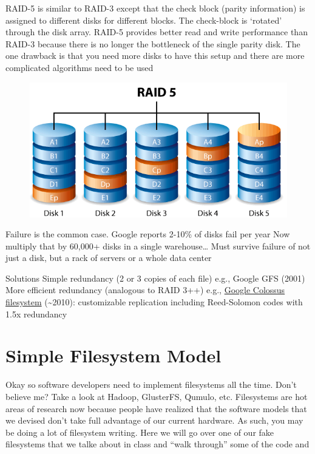 RAID-5 is similar to RAID-3 except that the check block (parity information) is assigned to different disks for different blocks. The check-block is `rotated' through the disk array. RAID-5 provides better read and write performance than RAID-3 because there is no longer the bottleneck of the single parity disk. The one drawback is that you need more disks to have this setup and there are more complicated algorithms need to be used

\begin{figure}[htbp]
\centering
\includegraphics[width=.8\textwidth]{filesystems/images/raid_5.png}
\caption{}
\end{figure}

Failure is the common case. Google reports 2-10\% of disks fail per year Now multiply that by 60,000+ disks in a single warehouse\ldots{} Must survive failure of not just a disk, but a rack of servers or a whole data center

Solutions Simple redundancy (2 or 3 copies of each file) e.g., Google GFS (2001) More efficient redundancy (analogous to RAID 3++) e.g., \href{http://goo.gl/LwFIy}{Google Colossus filesystem} (\textasciitilde{}2010): customizable replication including Reed-Solomon codes with 1.5x redundancy

\section{Simple Filesystem Model}

Okay so software developers need to implement filesystems all the time.
Don't believe me? Take a look at Hadoop, GlusterFS, Qumulo, etc.
Filesystems are hot areas of research now because people have realized that the software models that we devised don't take full advantage of our current hardware.
As such, you may be doing a lot of filesystem writing.
Here we will go over one of our fake filesystems that we talke about in class and ``walk through'' some of the code and

